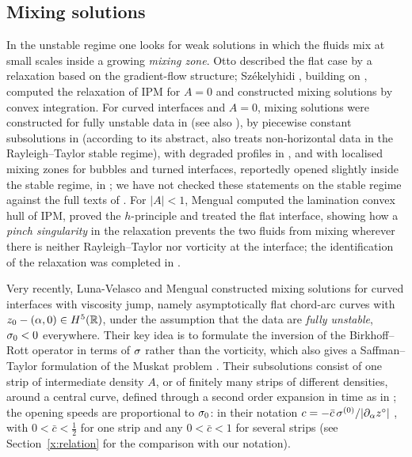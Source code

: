 \subsection{Mixing solutions}
In the unstable regime one looks for weak solutions in which the fluids mix at small scales inside a growing \emph{mixing zone}. Otto \cite{Ott99} described the flat case by a
relaxation based on the gradient-flow structure; Sz\'ekelyhidi \cite{Sze12}, building on \cite{DLS09,CFG11,Shv11}, computed the relaxation of IPM for $A=0$ and constructed mixing
solutions by convex integration. For curved interfaces and $A=0$, mixing solutions were constructed for fully unstable data in \cite{CCF21} (see also \cite{ACF21}), by piecewise constant
subsolutions in \cite{FS18,NS21} (according to its abstract, \cite{FS18} also treats non-horizontal data in the Rayleigh--Taylor stable regime), with degraded profiles in \cite{CFM19}, and with
localised mixing zones for bubbles and turned interfaces, reportedly opened slightly inside the stable regime, in \cite{CFM22}; we have not checked these statements on the stable regime
against the full texts of \cite{FS18,CFM22}.
For $|A|<1$, Mengual \cite{Men22} computed the lamination convex hull of IPM, proved the $h$-principle and treated the flat interface, showing how a \emph{pinch singularity} in the relaxation
prevents the two fluids from mixing wherever there is neither Rayleigh--Taylor nor vorticity at the interface; the identification of the relaxation was completed in \cite[Thm.~2.4]{LM26}.

Very recently, Luna-Velasco and Mengual \cite{LM26} constructed mixing solutions for curved interfaces with viscosity jump, namely asymptotically flat chord-arc curves with
$z_0-(\alpha,0)\in H^5(\mathbb{R})$, under the assumption that the data are \emph{fully unstable}, $\sigma_0<0$ everywhere. Their key idea is to formulate the inversion of the Birkhoff--Rott operator in
terms of $\sigma$ rather than the vorticity, which also gives a Saffman--Taylor formulation of the Muskat problem \cite[Sec.~3.1]{LM26}. Their subsolutions consist of one strip of intermediate
density $A$, or of finitely many strips of different densities, around a central curve, defined through a second order expansion in time as in \cite{FS18,CFM22}; the opening speeds are proportional
to $\sigma_0$: in their notation $c=-\bar c\,\sigma^{(0)}/|\partial_\alpha z^\circ|$ \cite[(7.13)]{LM26}, with $0<\bar c<\frac12$ for one strip and any $0<\bar c<1$ for several strips
\cite[Sec.~7.5]{LM26} (see Section~\ref{x:relation} for the comparison with our notation).

